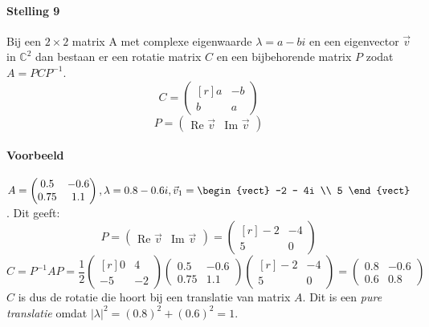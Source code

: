 \paragraph{Stelling 9} 
Bij een $2 \times 2$ matrix A met complexe eigenwaarde $\lambda = a-bi$ en een eigenvector $\vec{v}$ in $\mathbb{C}^2$ dan bestaan er een rotatie matrix $C$ en een bijbehorende matrix $P$ zodat $A = PCP^{-1}$.
\[C = \begin{pmatrix*}[r] a & -b \\ b & a \end{pmatrix*} \]
\[ P = \begin{pmatrix} \mbox{Re } \vec{v} & \mbox{Im } \vec{v} \end{pmatrix} \]

\paragraph{Voorbeeld} $A = \begin{pmatrix} 0.5 & -0.6 \\ 0.75 & 1.1 \end{pmatrix}, \lambda = 0.8 - 0.6i, \vec{v}_1 = \begin{vect} -2 - 4i \\ 5 \end{vect}$.
Dit geeft:
\[ P = \begin{pmatrix} \mbox{Re } \vec{v} & \mbox{Im } \vec{v} \end{pmatrix} = \begin{pmatrix*}[r] -2 & -4 \\ 5 & 0 \end{pmatrix*} \]
\[ C = P^{-1}AP = \frac{1}{2} \begin{pmatrix*}[r]
	0 & 4 \\
	-5 & -2
\end{pmatrix*} \begin{pmatrix}
	0.5 & -0.6 \\
	0.75 & 1.1
\end{pmatrix} \begin{pmatrix*}[r]
	-2 & -4 \\
	5 & 0
\end{pmatrix*} = \begin{pmatrix}
	0.8 & -0.6 \\
	0.6 & 0.8
\end{pmatrix} \]
$C$ is dus de rotatie die hoort bij een translatie van matrix $A$. Dit is een \emph{pure translatie} omdat $|\lambda|^2 = (0.8)^2 + (0.6)^2 = 1$.